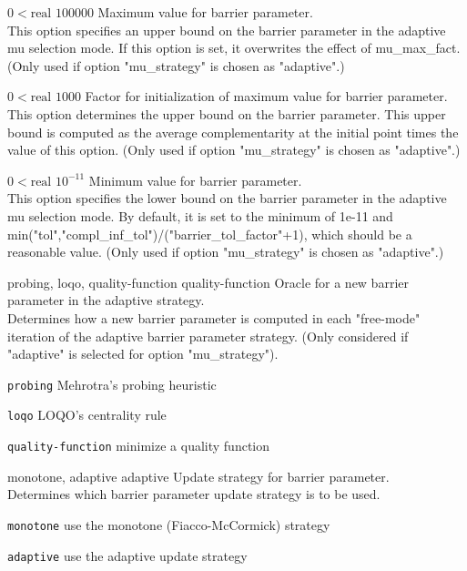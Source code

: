 %
{$0<\textrm{real}$}%
{$100000$}%
{Maximum value for barrier parameter.\\
This option specifies an upper bound on the barrier parameter in the adaptive mu selection mode.  If this option is set, it overwrites the effect of mu\_max\_fact. (Only used if option "mu\_strategy" is chosen as "adaptive".)}%
{}

%
{$0<\textrm{real}$}%
{$1000$}%
{Factor for initialization of maximum value for barrier parameter.\\
This option determines the upper bound on the barrier parameter.  This upper bound is computed as the average complementarity at the initial point times the value of this option. (Only used if option "mu\_strategy" is chosen as "adaptive".)}%
{}

%
{$0<\textrm{real}$}%
{$10^{-11}$}%
{Minimum value for barrier parameter.\\
This option specifies the lower bound on the barrier parameter in the adaptive mu selection mode. By default, it is set to the minimum of 1e-11 and min("tol","compl\_inf\_tol")/("barrier\_tol\_factor"+1), which should be a reasonable value. (Only used if option "mu\_strategy" is chosen as "adaptive".)}%
{}

%
{probing, loqo, quality-function}%
{quality-function}%
{Oracle for a new barrier parameter in the adaptive strategy.\\
Determines how a new barrier parameter is computed in each "free-mode" iteration of the adaptive barrier parameter strategy. (Only considered if "adaptive" is selected for option "mu\_strategy").}%
{\begin{list}{}{
\setlength{\parsep}{0em}
\setlength{\leftmargin}{5ex}
\setlength{\labelwidth}{2ex}
\setlength{\itemindent}{0ex}
\setlength{\topsep}{0pt}}
\item[\texttt{probing}] Mehrotra's probing heuristic
\item[\texttt{loqo}] LOQO's centrality rule
\item[\texttt{quality-function}] minimize a quality function
\end{list}
}

%
{monotone, adaptive}%
{adaptive}%
{Update strategy for barrier parameter.\\
Determines which barrier parameter update strategy is to be used.}%
{\begin{list}{}{
\setlength{\parsep}{0em}
\setlength{\leftmargin}{5ex}
\setlength{\labelwidth}{2ex}
\setlength{\itemindent}{0ex}
\setlength{\topsep}{0pt}}
\item[\texttt{monotone}] use the monotone (Fiacco-McCormick) strategy
\item[\texttt{adaptive}] use the adaptive update strategy
\end{list}
}

